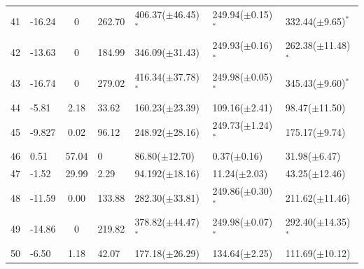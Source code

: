 \documentclass[conference]{IEEEtran}
\begin{document}
\begin{table}[t]
{\begin{tabular}{l|l|c|l|l|l|l}
41    &-16.24    &0    &262.70    &406.37($\pm$46.45)$^*$ &249.94($\pm$0.15)$^*$  &332.44($\pm$9.65)$^*$ \\
42    &-13.63    &0    &184.99    &346.09($\pm$31.43) &249.93($\pm$0.16)$^*$  &262.38($\pm$11.48)$^*$ \\
43    &-16.74    &0    &279.02   &416.34($\pm$37.78)$^*$ &249.98($\pm$0.05)$^*$  &345.43($\pm$9.60)$^*$ \\
44    &-5.81    &2.18    &33.62   &160.23($\pm$23.39) &109.16($\pm$2.41)  &98.47($\pm$11.50)  \\
45    &-9.827    &0.02    &96.12    &248.92($\pm$28.16) &249.73($\pm$1.24)$^*$  &175.17($\pm$9.74)  \\
46    &0.51    &57.04    &0    &86.80($\pm$12.70) &0.37($\pm$0.16)  &31.98($\pm$6.47)\\
47    &-1.52    &29.99    &2.29    &94.192($\pm$18.16) &11.24($\pm$2.03)  &43.25($\pm$12.46) \\
48    &-11.59    &0.00    &133.88    &282.30($\pm$33.81) &249.86($\pm$0.30)$^*$  &211.62($\pm$11.46)\\
49    &-14.86    &0    &219.82    &378.82($\pm$44.47)$^*$ &249.98($\pm$0.07)$^*$  &292.40($\pm$14.35)$^*$\\
50    &-6.50   &1.18    &42.07    &177.18($\pm$26.29) &134.64($\pm$2.25)  &111.69($\pm$10.12)
\end{tabular}
}
\end{table}

 
\end{document}
